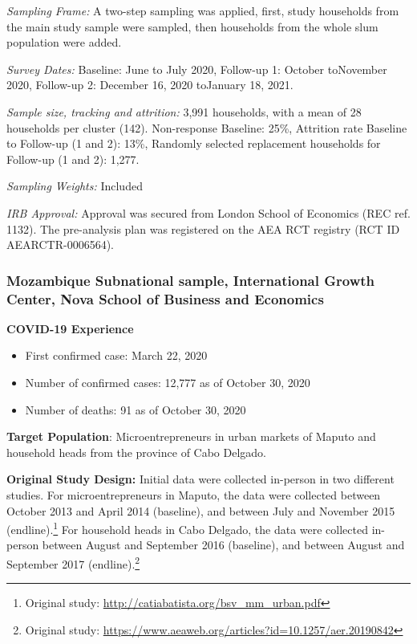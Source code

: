 \documentclass[
  12pt,
]{article}
\begin{document}
\emph{Sampling Frame:} A two-step sampling was applied, first, study households from the main study sample were sampled, then households from the whole slum population were added.

\emph{Survey Dates:}
Baseline: June to July 2020, Follow-up 1: October toNovember 2020, Follow-up 2: December 16, 2020 toJanuary 18, 2021.

\emph{Sample size, tracking and attrition:} 3,991 households, with a mean of 28 households per cluster (142). Non-response Baseline: 25\%, Attrition rate Baseline to Follow-up (1 and 2): 13\%, Randomly selected replacement households for Follow-up (1 and 2): 1,277.

\emph{Sampling Weights:} Included

\emph{IRB Approval:} Approval was secured from London School of Economics (REC ref. 1132). The pre-analysis plan was registered on the AEA RCT registry (RCT ID AEARCTR-0006564).

\hypertarget{mozambique-subnational-sample-international-growth-center-nova-school-of-business-and-economics}{%
\subsubsection*{Mozambique Subnational sample, International Growth Center, Nova School of Business and Economics}\label{mozambique-subnational-sample-international-growth-center-nova-school-of-business-and-economics}}

\textbf{COVID-19 Experience}

\begin{itemize}
\item First confirmed case: March 22, 2020
\item Number of confirmed cases:  12,777 as of October 30, 2020 
\item Number of deaths:  91 as of October 30, 2020
\end{itemize}

\textbf{Target Population}: Microentrepreneurs in urban markets of Maputo and household heads from the province of Cabo Delgado.

\textbf{Original Study Design:} Initial data were collected in-person in two different studies. For microentrepreneurs in Maputo, the data were collected between October 2013 and April 2014 (baseline), and between July and November 2015 (endline).\footnote{Original study: \url{http://catiabatista.org/bsv_mm_urban.pdf}} For household heads in Cabo Delgado, the data were collected in-person between August and September 2016 (baseline), and between August and September 2017 (endline).\footnote{Original study: \url{https://www.aeaweb.org/articles?id=10.1257/aer.20190842}}
\end{document}
